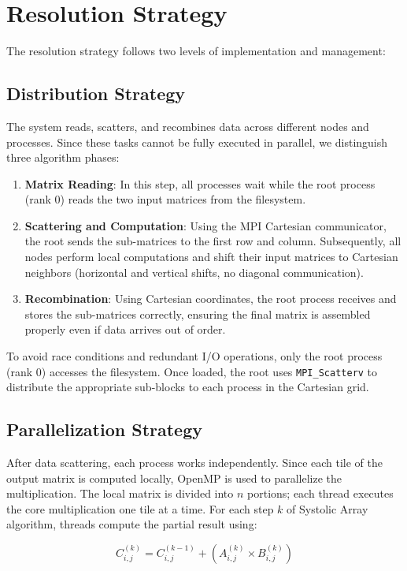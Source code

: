 \documentclass[conference]{IEEEtran}
\numberwithin{figure}{section}
\numberwithin{table}{section}
\begin{document}
\section*{Resolution Strategy}
The resolution strategy follows two levels of implementation and management:

\subsection*{Distribution Strategy}
The system reads, scatters, and recombines data across different nodes and processes. Since these tasks cannot be fully executed in parallel, we distinguish three algorithm phases:

\begin{enumerate}
    \item \textbf{Matrix Reading}: In this step, all processes wait while the root process (rank 0) reads the two input matrices from the filesystem.
    \item \textbf{Scattering and Computation}: Using the MPI Cartesian communicator, the root sends the sub-matrices to the first row and column. Subsequently, all nodes perform local computations and shift their input matrices to Cartesian neighbors (horizontal and vertical shifts, no diagonal communication).
    \item \textbf{Recombination}: Using Cartesian coordinates, the root process receives and stores the sub-matrices correctly, ensuring the final matrix is assembled properly even if data arrives out of order.
\end{enumerate}

To avoid race conditions and redundant I/O operations, only the root process (rank 0) accesses the filesystem. Once loaded, the root uses \texttt{MPI\_Scatterv} to distribute the appropriate sub-blocks to each process in the Cartesian grid.

\subsection*{Parallelization Strategy}
After data scattering, each process works independently. Since each tile of the output matrix is computed locally, OpenMP is used to parallelize the multiplication. The local matrix is divided into $n$ portions; each thread executes the core multiplication one tile at a time. For each step $k$ of Systolic Array algorithm, threads compute the partial result using:

$$ C_{i,j}^{(k)} = C_{i,j}^{(k-1)} + (A_{i,j}^{(k)} \times B_{i,j}^{(k)}) $$
\end{document}
